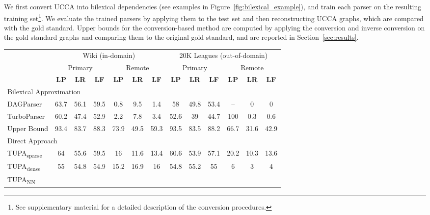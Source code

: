 \documentclass[11pt]{article}
\newcommand{\parser}[1]{TUPA\textsubscript{#1}}
\newcommand{\secref}[1]{Section~\ref{#1}}
\newcommand{\figref}[1]{Figure~\ref{#1}}
\begin{document}
We first convert UCCA into bilexical dependencies
(see examples in \figref{fig:bilexical_example}), and train each parser on the resulting
training set\footnote{See supplementary material for a detailed description of
the conversion procedures.}.
We evaluate the trained parsers by applying them to the test set
and then reconstructing UCCA graphs, which are compared with the gold standard.
Upper bounds for the conversion-based method are computed by applying
the conversion and inverse conversion on the gold standard
graphs and comparing them to the original gold standard,
and are reported in \secref{sec:results}.


\begin{table*}[ht]
\begin{tabular}{l|ccc|ccc||ccc|ccc}
& \multicolumn{6}{c||}{Wiki (in-domain)} & \multicolumn{6}{c}{20K Leagues (out-of-domain)} \\
& \multicolumn{3}{c|}{Primary} & \multicolumn{3}{c||}{Remote}
& \multicolumn{3}{c|}{Primary} & \multicolumn{3}{c}{Remote} \\
& \textbf{LP} & \textbf{LR} & \textbf{LF} & \textbf{LP} & \textbf{LR} & \textbf{LF}
& \textbf{LP} & \textbf{LR} & \textbf{LF} & \textbf{LP} & \textbf{LR} & \textbf{LF} \\
\hline
\multicolumn{4}{l}{\rule{0pt}{2ex} \footnotesize Bilexical Approximation} \\
DAGParser
& 63.7 & 	56.1	 & 59.5	 & 0.8	 & 9.5	 &  1.4
& 58	 & 49.8	 & 53.4 & -- & 0 & 0 \\
TurboParser
& 60.2	 & 47.4	 & 52.9	 & 2.2	 & 7.8	 &  3.4
& 52.6	 & 39	 & 44.7	 & 100	 & 0.3	 & 0.6 \\
Upper Bound %
& 93.4 & 83.7 & 88.3 & 73.9 & 49.5 & 59.3
& 93.5 & 83.5 & 88.2 & 66.7 & 31.6 & 42.9 \\
\hline
\multicolumn{4}{l}{\rule{0pt}{2ex} \footnotesize Direct Approach} \\
\parser{sparse}
& 64 & 55.6 & 59.5 & 16 & 11.6 & 13.4 
& 60.6 & 53.9 & 57.1 & 20.2 & 10.3 & 13.6 \\
\parser{dense} 
& 55 & 54.8 & 54.9 & 15.2 & 16.9 & 16 
& 54.8 & 55.2 & 55 & 6 & 3 & 4 \\
\parser{NN}
& {\bf } & {\bf } & {\bf } & {\bf } & {\bf } & {\bf } 
& {\bf } & {\bf } & {\bf } & {\bf } & {\bf } & {\bf }
\end{tabular}
\caption{\label{table:results}
  Main experimental results in percents, on the \textit{Wiki} test set (left, in-domain)
  and the \textit{20K Leagues} set (right, out-of-domain).
  Columns correspond to labeled precision, recall and F-score for the different parsers,
  for both primary and remote edges.
  Top: results for DAGParser and TurboParser, after conversion to bilexical graphs.
  Bottom: results for our \parser{}, trained on the original UCCA graphs, using each of the
  three classifiers.
  \parser{NN} obtains the highest scores in all metrics, surpassing the bilexical parsers
  and the other classifiers.
}
\end{table*}
\end{document}
